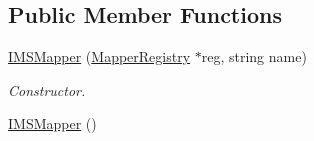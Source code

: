\subsection*{Public Member Functions}
\begin{DoxyCompactItemize}
\item 
\hyperlink{classIMSMapper_ae98b7c56f1613969e0919f2885ce123d}{IMSMapper} (\hyperlink{classMapperRegistry}{MapperRegistry} $\ast$reg, string name)
\begin{DoxyCompactList}\small\item\em Constructor. \item\end{DoxyCompactList}\item 
\hypertarget{classIMSMapper_aa9a81362b530648633c95d7fb2f6bbca}{
\hyperlink{classIMSMapper_aa9a81362b530648633c95d7fb2f6bbca}{IMSMapper} ()}
\label{classIMSMapper_aa9a81362b530648633c95d7fb2f6bbca}


\end{DoxyCompactItemize}
